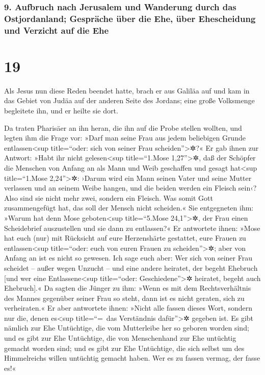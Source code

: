 \hypertarget{aufbruch-nach-jerusalem-und-wanderung-durch-das-ostjordanland-gespruxe4che-uxfcber-die-ehe-uxfcber-ehescheidung-und-verzicht-auf-die-ehe}{%
\subsubsection{9. Aufbruch nach Jerusalem und Wanderung durch das
Ostjordanland; Gespräche über die Ehe, über Ehescheidung und Verzicht
auf die
Ehe}\label{aufbruch-nach-jerusalem-und-wanderung-durch-das-ostjordanland-gespruxe4che-uxfcber-die-ehe-uxfcber-ehescheidung-und-verzicht-auf-die-ehe}}

\hypertarget{section-18}{%
\section{19}\label{section-18}}

 Als Jesus nun diese Reden beendet hatte, brach er aus
Galiläa auf und kam in das Gebiet von Judäa auf der anderen Seite des
Jordans;  eine große Volksmenge begleitete ihn, und er
heilte sie dort.

 Da traten Pharisäer an ihn heran, die ihn auf die Probe
stellen wollten, und legten ihm die Frage vor: »Darf man seine Frau aus
jedem beliebigen Grunde entlassen\textless sup title=``oder: sich von
seiner Frau scheiden''\textgreater✲?«  Er gab ihnen zur
Antwort: »Habt ihr nicht gelesen\textless sup title=``1.Mose
1,27''\textgreater✲, daß der Schöpfer die Menschen von Anfang an als
Mann und Weib geschaffen  und gesagt hat\textless sup
title=``1.Mose 2,24''\textgreater✲: ›Darum wird ein Mann seinen Vater
und seine Mutter verlassen und an seinem Weibe hangen, und die beiden
werden ein Fleisch sein‹?  Also sind sie nicht mehr zwei,
sondern ein Fleisch. Was somit Gott zusammengefügt hat, das soll der
Mensch nicht scheiden.«  Sie entgegneten ihm: »Warum hat
denn Mose geboten\textless sup title=``5.Mose 24,1''\textgreater✲, der
Frau einen Scheidebrief auszustellen und sie dann zu entlassen?«
 Er antwortete ihnen: »Mose hat euch (nur) mit Rücksicht
auf eure Herzenshärte gestattet, eure Frauen zu entlassen\textless sup
title=``oder: euch von euren Frauen zu scheiden''\textgreater✲; aber von
Anfang an ist es nicht so gewesen.  Ich sage euch aber:
Wer sich von seiner Frau scheidet -- außer wegen Unzucht -- und eine
andere heiratet, der begeht Ehebruch {[}und wer eine
Entlassene\textless sup title=``oder: Geschiedene''\textgreater✲
heiratet, begeht auch Ehebruch{]}.«  Da sagten die Jünger
zu ihm: »Wenn es mit dem Rechtsverhältnis des Mannes gegenüber seiner
Frau so steht, dann ist es nicht geraten, sich zu verheiraten.«
 Er aber antwortete ihnen: »Nicht alle fassen dieses
Wort, sondern nur die, denen es\textless sup title=``=~das Verständnis
dafür''\textgreater✲ gegeben ist.  Es gibt nämlich zur
Ehe Untüchtige, die vom Mutterleibe her so geboren worden sind; und es
gibt zur Ehe Untüchtige, die von Menschenhand zur Ehe untüchtig gemacht
worden sind; und es gibt zur Ehe Untüchtige, die sich selbst um des
Himmelreichs willen untüchtig gemacht haben. Wer es zu fassen vermag,
der fasse es!«

